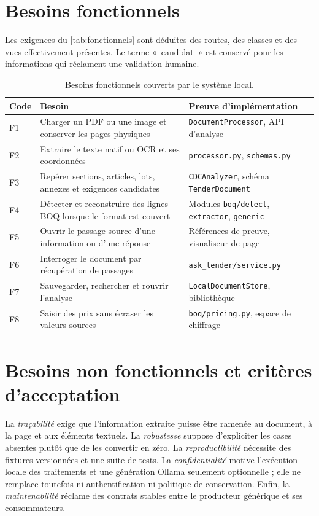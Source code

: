 \section{Besoins fonctionnels}
Les exigences du \autoref{tab:fonctionnels} sont déduites des routes, des classes et des vues effectivement présentes. Le terme «~candidat~» est conservé pour les informations qui réclament une validation humaine.

\begin{table}[htbp]\centering\tighttable
\begin{tabularx}{\textwidth}{@{}p{15mm}Y p{47mm}@{}}\toprule
Code & Besoin & Preuve d'implémentation\\\midrule
F1 & Charger un PDF ou une image et conserver les pages physiques & \texttt{DocumentProcessor}, API d'analyse\\
F2 & Extraire le texte natif ou OCR et ses coordonnées & \texttt{processor.py}, \texttt{schemas.py}\\
F3 & Repérer sections, articles, lots, annexes et exigences candidates & \texttt{CDCAnalyzer}, schéma \texttt{TenderDocument}\\
F4 & Détecter et reconstruire des lignes BOQ lorsque le format est couvert & Modules \texttt{boq/detect}, \texttt{extractor}, \texttt{generic}\\
F5 & Ouvrir le passage source d'une information ou d'une réponse & Références de preuve, visualiseur de page\\
F6 & Interroger le document par récupération de passages & \texttt{ask\_tender/service.py}\\
F7 & Sauvegarder, rechercher et rouvrir l'analyse & \texttt{LocalDocumentStore}, bibliothèque\\
F8 & Saisir des prix sans écraser les valeurs sources & \texttt{boq/pricing.py}, espace de chiffrage\\\bottomrule
\end{tabularx}
\caption{Besoins fonctionnels couverts par le système local.}\label{tab:fonctionnels}
\end{table}

\section{Besoins non fonctionnels et critères d'acceptation}
La \emph{traçabilité} exige que l'information extraite puisse être ramenée au document, à la page et aux éléments textuels. La \emph{robustesse} suppose d'expliciter les cases absentes plutôt que de les convertir en zéro. La \emph{reproductibilité} nécessite des fixtures versionnées et une suite de tests. La \emph{confidentialité} motive l'exécution locale des traitements et une génération Ollama seulement optionnelle ; elle ne remplace toutefois ni authentification ni politique de conservation. Enfin, la \emph{maintenabilité} réclame des contrats stables entre le producteur générique et ses consommateurs.

